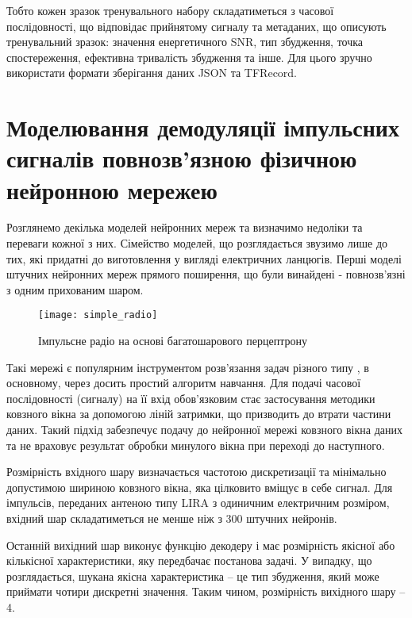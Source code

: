 Тобто кожен зразок тренувального набору складатиметься з часової
послідовності, що відповідає прийнятому сигналу та метаданих, що описують 
тренувальний зразок: значення енергетичного SNR, тип збудження, 
точка спостереження, ефективна тривалість збудження та інше. Для цього
зручно використати формати зберігання даних JSON та TFRecord.

\section{Моделювання демодуляції імпульсних сигналів повнозв'язною фізичною нейронною мережею}

Розглянемо декілька моделей нейронних мереж та визначимо недоліки та переваги
кожної з них. Сімейство моделей, що розглядається звузимо лише до тих, які 
придатні до виготовлення у вигляді електричних ланцюгів. Перші моделі штучних 
нейронних мереж прямого поширення, що були винайдені - повнозв'язні з одним 
прихованим шаром.



\begin{figure}[htbp] \begin{center}
\texttt{[image: simple\_radio]}
\caption{Імпульсне радіо на основі багатошарового перцептрону} 
\label{fig:mp_radio}
\end{center} \end{figure}

Такі мережі є популярним інструментом розв'язання задач різного типу 
\cite{imp:Kussul2004}, в основному, через досить простий алгоритм навчання.
Для подачі часової послідовності (сигналу) на її вхід обов'язковим стає 
застосування методики ковзного вікна за допомогою ліній затримки, що 
призводить до втрати частини даних. Такий підхід забезпечує подачу до 
нейронної мережі ковзного вікна даних та не враховує результат обробки 
минулого вікна при переході до наступного.

Розмірність вхідного шару визначається частотою дискретизації та мінімально 
допустимою шириною ковзного вікна, яка цілковито вміщує в себе сигнал. Для 
імпульсів, переданих антеною типу LIRA з одиничним електричним розміром, 
вхідний шар складатиметься не менше ніж з 300 штучних нейронів.

Останній вихідний шар виконує функцію декодеру і має розмірність 
якісної або кількісної характеристики, яку передбачає постанова задачі.
У випадку, що розглядається, шукана якісна характеристика -- це тип 
збудження, який може приймати чотири дискретні значення. Таким чином,
розмірність вихідного шару -- 4.

